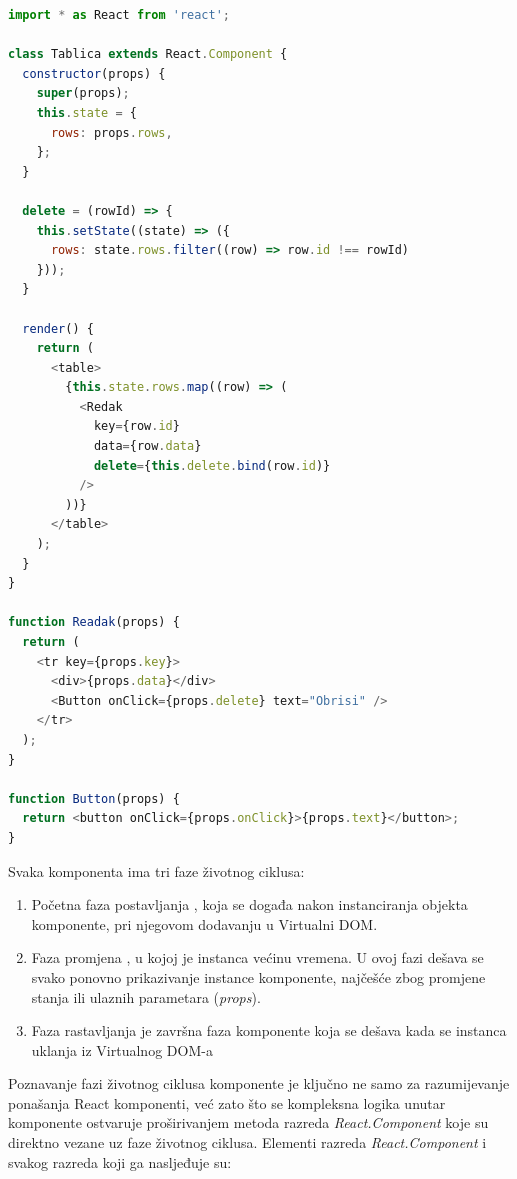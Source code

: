 \documentclass[times, utf8, diplomski, numeric]{fer}
\newcommand{\razmakp}{\vspace{18pt}}
\newcommand{\razmaks}{\vspace{10pt}}
\begin{document}
\razmakp %
\begin{lstlisting}[language=JavaScript, caption={Primjer prosljeđivanja podataka i akcija iz roditeljske komponente}, label={lst:component_props}]
import * as React from 'react';

class Tablica extends React.Component {
  constructor(props) {
    super(props);
    this.state = {
      rows: props.rows,
    };
  }

  delete = (rowId) => {
    this.setState((state) => ({
      rows: state.rows.filter((row) => row.id !== rowId)
    }));
  }

  render() {
    return (
      <table>
        {this.state.rows.map((row) => (
          <Redak
            key={row.id}
            data={row.data}
            delete={this.delete.bind(row.id)}
          />
        ))}
      </table>
    );
  }
}

function Readak(props) {
  return (
    <tr key={props.key}>
      <div>{props.data}</div>
      <Button onClick={props.delete} text="Obrisi" />
    </tr>
  );
}

function Button(props) {
  return <button onClick={props.onClick}>{props.text}</button>;
}
\end{lstlisting}
\razmaks

Svaka komponenta ima tri faze životnog ciklusa:

\begin{enumerate}
    \item Početna faza postavljanja , koja se događa nakon instanciranja objekta komponente, pri njegovom dodavanju u Virtualni DOM.
    \item Faza promjena , u kojoj je instanca većinu vremena. U ovoj fazi dešava se svako ponovno prikazivanje  instance komponente, najčešće zbog promjene stanja ili ulaznih parametara (\emph{props}).
    \item Faza rastavljanja  je završna faza komponente koja se dešava kada se instanca uklanja iz Virtualnog DOM-a
\end{enumerate}
\razmaks

Poznavanje fazi životnog ciklusa komponente je ključno ne samo za razumijevanje ponašanja React komponenti, već zato što se kompleksna logika unutar komponente ostvaruje proširivanjem metoda razreda \emph{React.Component} koje su direktno vezane uz faze životnog ciklusa.
Elementi razreda \emph{React.Component} i svakog razreda koji ga nasljeđuje su\citep{react_docs}:
\end{document}
